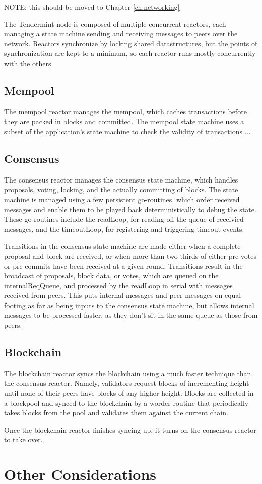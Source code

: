 NOTE: this should be moved to Chapter \ref{ch:networking}

The Tendermint node is composed of multiple concurrent reactors, 
each managing a state machine sending and receiving messages to peers over the network.
Reactors synchronize by locking shared datastructures, but the points of synchronization are kept to a minimum,
so each reactor runs mostly concurrently with the others.

\subsection{Mempool}

The mempool reactor manages the mempool, 
which caches transactions before they are packed in blocks and committed.
The mempool state machine uses a subset of the application's state machine to check the validity of transactions ...

\subsection{Consensus}

The consensus reactor manages the consensus state machine, which handles proposals, voting, locking, 
and the actually committing of blocks.
The state machine is managed using a few persistent go-routines, 
which order received messages and enable them to be played back deterministically to debug the state.
These go-routines include the readLoop, for reading off the queue of receivied messages, 
and the timeoutLoop, for registering and triggering timeout events. 

Transitions in the consensus state machine are made either when a complete proposal and block are received,
or when more than two-thirds of either pre-votes or pre-commits have been received at a given round.
Transitions result in the broadcast of proposals, block data, or votes, which are queued on the internalReqQueue,
and processed by the readLoop in serial with messages received from peers.
This puts internal messages and peer messages on equal footing as far as being inputs to the consensus state machine, 
but allows internal messages to be processed faster, as they don't sit in the same queue as those from peers.

\subsection{Blockchain}

The blockchain reactor syncs the blockchain using a much faster technique than the consensus reactor.
Namely, validators request blocks of incrementing height until none of their peers have blocks of any higher height.
Blocks are collected in a blockpool and synced to the blockchain by a worder routine that periodically takes blocks from the pool
and validates them against the current chain.

Once the blockchain reactor finishes syncing up, it turns on the consensus reactor to take over.

\section{Other Considerations}
